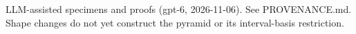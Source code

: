 \documentclass[11pt]{article}
\begin{document}

\bigskip
{\footnotesize LLM-assisted specimens and proofs (gpt-6, 2026-11-06).
See PROVENANCE.md. Shape changes do not yet construct the pyramid or its interval-basis restriction.}
\end{document}
